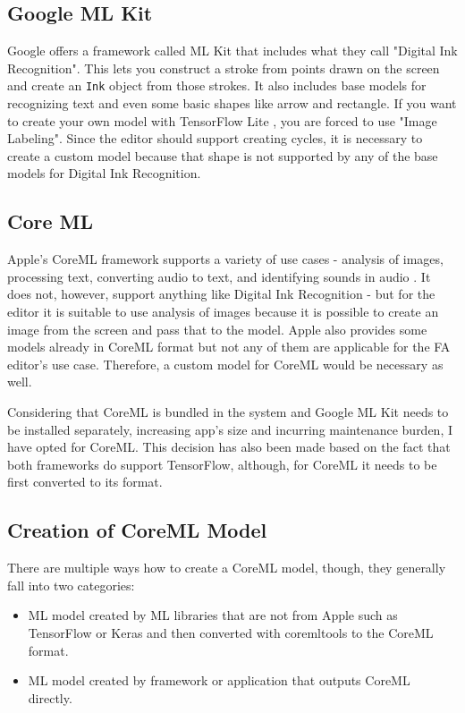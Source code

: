 \subsection{Google ML Kit}

Google offers a framework called ML Kit that includes what they call "Digital Ink Recognition". This lets you construct a stroke from points drawn on the screen and create an \lstinline{Ink} object from those strokes. It also includes base models for recognizing text and even some basic shapes like arrow and rectangle. If you want to create your own model with TensorFlow Lite \cite{tensorflow}, you are forced to use "Image Labeling". Since the editor should support creating cycles, it is necessary to create a custom model because that shape is not supported by any of the base models for Digital Ink Recognition.

\subsection{Core ML}

Apple's CoreML framework supports a variety of use cases - analysis of images, processing text, converting audio to text, and identifying sounds in audio \cite{coreml}. It does not, however, support anything like Digital Ink Recognition - but for the editor it is suitable to use analysis of images because it is possible to create an image from the screen and pass that to the model. Apple also provides some models already in CoreML format \cite{coreml-models} but not any of them are applicable for the FA editor's use case. Therefore, a custom model for CoreML would be necessary as well.

Considering that CoreML is bundled in the system and Google ML Kit needs to be installed separately, increasing app's size and incurring maintenance burden, I have opted for CoreML. This decision has also been made based on the fact that both frameworks do support TensorFlow, although, for CoreML it needs to be first converted to its format.

\subsection{Creation of CoreML Model}

There are multiple ways how to create a CoreML model, though, they generally fall into two categories:
\begin{itemize}
    \item ML model created by ML libraries that are not from Apple such as TensorFlow or Keras \cite{keras} and then converted with coremltools \cite{coremltools} to the CoreML format.
    \item ML model created by framework or application that outputs CoreML directly.
\end{itemize}

